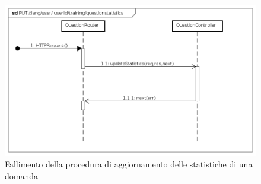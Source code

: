 \begin{itemize}
\begin{figure}[ht]
	\centering
	\includegraphics[scale=0.45]{UML/DiagrammiDiSequenza/Back-end/PUT__lang_user__userId_training_questionstatistics_failure.png}
	\caption{Fallimento della procedura di aggiornamento delle statistiche di una domanda}
\end{figure}
\FloatBarrier

\end{itemize} 

